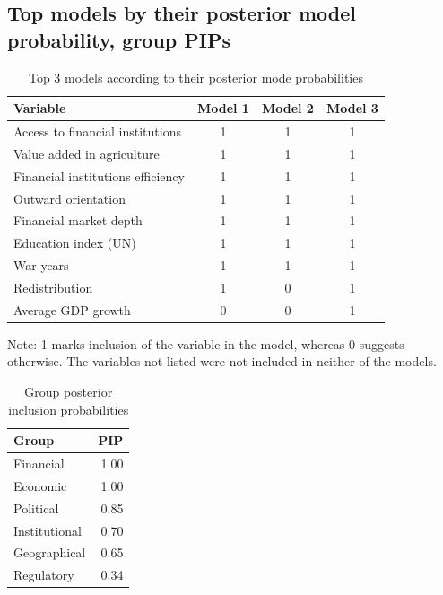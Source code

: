 \begin{refsection}
\begin{subappendices}
    \restoregeometry
    \section{Top models by their posterior model probability, group \acp{PIP}}
    \begin{table}[!htbp]
    \centering
    \caption{Top 3 models according to their posterior mode probabilities}
    \label{ch3table:top3}
    \begin{threeparttable}
    \begin{tabularx}{0.7\linewidth}{lccc}
      \toprule
    Variable & Model 1 & Model 2 & Model 3 \\ 
      \midrule
    Access to financial institutions & 1 & 1 & 1 \\
    Value added in agriculture & 1 & 1 & 1 \\ 
    Financial institutions efficiency & 1 & 1 & 1 \\
    Outward orientation & 1 & 1 & 1 \\
    Financial market depth & 1 & 1 & 1 \\
    Education index (UN) & 1 & 1 & 1 \\
    War years & 1 & 1 & 1 \\
    Redistribution & 1 & 0 & 1 \\
    Average GDP growth & 0 & 0 & 1 \\
      \bottomrule
    \end{tabularx}
    \begin{tablenotes}
    \footnotesize													
    \item Note: 1 marks inclusion of the variable in the model, whereas 0 suggests otherwise. The variables not listed were not included in neither of the models.
    \end{tablenotes}
    \end{threeparttable}
    \end{table}			
    
    \begin{table}[ht!]
    \caption{Group posterior inclusion probabilities}
    \label{ch3tab:grouppips}
    \centering
    \begin{tabular}{lr}
      \toprule
    Group & \ac{PIP} \\ 
      \midrule
      Financial & 1.00 \\ 
      Economic & 1.00 \\ 
      Political & 0.85 \\ 
      Institutional & 0.70 \\ 
      Geographical & 0.65 \\ 
      Regulatory & 0.34 \\ 
       \bottomrule
    \end{tabular}
    \end{table}
    \clearpage
    

\end{subappendices}
\end{refsection}
